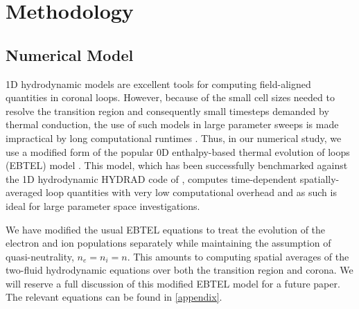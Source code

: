 \documentclass[apj]{emulateapj}
\begin{document}
	\section{Methodology}
	\label{sec:methods}
	\subsection{Numerical Model}
	\label{subsec:numerics}
	\par 1D hydrodynamic models are excellent tools for computing field-aligned quantities in coronal loops. However, because of the small cell sizes needed to resolve the transition region and consequently small timesteps demanded by thermal conduction, the use of such models in large parameter sweeps is made impractical by long computational runtimes \citep{bradshaw_influence_2013}. Thus, in our numerical study, we use a modified form of the popular 0D enthalpy-based thermal evolution of loops (EBTEL) model \citep{klimchuk_highly_2008,cargill_enthalpy-based_2012,cargill_enthalpy-based_2012-1,cargill_modelling_2015}. This model, which has been successfully benchmarked against the 1D hydrodynamic HYDRAD code of \citet{bradshaw_influence_2013}, computes time-dependent spatially-averaged loop quantities with very low computational overhead and as such is ideal for large parameter space investigations.
	\par We have modified the usual EBTEL equations \citep[see][]{cargill_enthalpy-based_2012} to treat the evolution of the electron and ion populations separately while maintaining the assumption of quasi-neutrality, $n_e=n_i=n$. This amounts to computing spatial averages of the two-fluid hydrodynamic equations over both the transition region and corona. We will reserve a full discussion of this modified EBTEL model for a future paper. The relevant equations can be found in \autoref{appendix}.  
\end{document}
